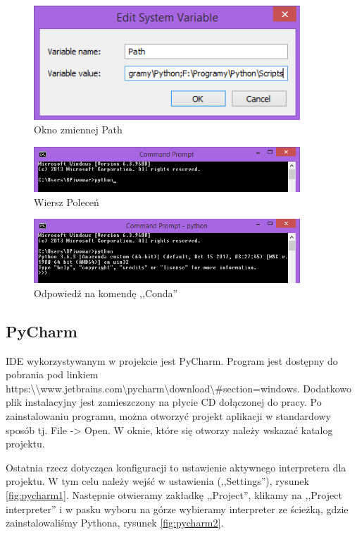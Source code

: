 \begin{figure}[h]
\centering
\includegraphics[width=10cm]{Zdjecia/5/python6}
\caption{Okno zmiennej Path}
\label{fig:anaconda6}
\end{figure}


\begin{figure}[h]
\centering
\includegraphics[width=10cm]{Zdjecia/5/python7}
\caption{Wiersz Poleceń}
\label{fig:anaconda7}
\end{figure}

\begin{figure}[h]
\centering
\includegraphics[width=10cm]{Zdjecia/5/python8}
\caption{Odpowiedź na komendę ,,Conda''}
\label{fig:anaconda8}
\end{figure}

\subsection{PyCharm}
\label{sec:pycharm}

IDE wykorzystywanym w projekcie jest PyCharm. Program jest dostępny do pobrania pod linkiem https:\textbackslash \textbackslash www.jetbrains.com\textbackslash pycharm\textbackslash download\textbackslash \#section=windows. Dodatkowo plik instalacyjny jest zamieszczony na płycie CD dołączonej do pracy. Po zainstalowaniu programu, można otworzyć projekt aplikacji w standardowy sposób tj. File -> Open. W oknie, które się otworzy należy wskazać katalog projektu.

Ostatnia rzecz dotycząca konfiguracji to ustawienie aktywnego interpretera dla projektu. W tym celu należy wejść w ustawienia (,,Settings''), rysunek \ref{fig:pycharm1}. Następnie otwieramy zakładkę ,,Project'', klikamy na ,,Project interpreter'' i w pasku wyboru na górze wybieramy interpreter ze ścieżką, gdzie zainstalowaliśmy Pythona, rysunek \ref{fig:pycharm2}.


